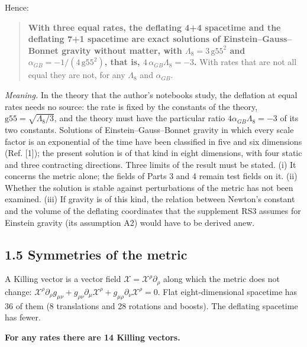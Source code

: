 \documentclass[
  10pt,
]{article}
\begin{document}
Hence:

\begin{quote}
\textbf{With three equal rates, the deflating 4+4 spacetime and the
deflating 7+1 spacetime are exact solutions of Einstein--Gauss--Bonnet
gravity without matter, with \(\Lambda_8=3\,\mathrm{g55}^2\) and
\(\alpha_{GB}=-1/(4\,\mathrm{g55}^2)\), that is,
\(4\,\alpha_{GB}\Lambda_8=-3\).} With rates that are not all equal they
are not, for any \(\Lambda_8\) and \(\alpha_{GB}\).
\end{quote}

\emph{Meaning.} In the theory that the author's notebooks study, the
deflation at equal rates needs no source: the rate is fixed by the
constants of the theory, \(\mathrm{g55}=\sqrt{\Lambda_8/3}\), and the
theory must have the particular ratio \(4\alpha_{GB}\Lambda_8=-3\) of
its two constants. Solutions of Einstein--Gauss--Bonnet gravity in which
every scale factor is an exponential of the time have been classified in
five and six dimensions (Ref. {[}1{]}); the present solution is of that
kind in eight dimensions, with four static and three contracting
directions. Three limits of the result must be stated. (i) It concerns
the metric alone; the fields of Parts 3 and 4 remain test fields on it.
(ii) Whether the solution is stable against perturbations of the metric
has not been examined. (iii) If gravity is of this kind, the relation
between Newton's constant and the volume of the deflating coordinates
that the supplement RS3 assumes for Einstein gravity (its assumption A2)
would have to be derived anew.

\hypertarget{symmetries-of-the-metric}{%
\subsection{1.5 Symmetries of the
metric}\label{symmetries-of-the-metric}}

A Killing vector is a vector field
\(\mathcal X=\mathcal X^\rho\partial_\rho\) along which the metric does
not change:
\(\mathcal X^\rho\partial_\rho g_{\mu\nu}+g_{\rho\nu}\partial_\mu\mathcal X^\rho+g_{\mu\rho}\partial_\nu\mathcal X^\rho=0\).
Flat eight-dimensional spacetime has 36 of them (8 translations and 28
rotations and boosts). The deflating spacetime has fewer.

\textbf{For any rates there are 14 Killing vectors.}
\end{document}
